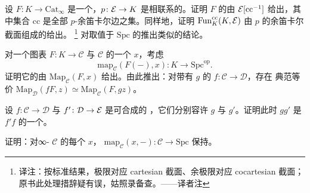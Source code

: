 \begin{exercise}\label{ex:colimit-cocartesian-localization}
设 $F\colon K \to \mathrm{Cat}_{\infty}$ 是一个\trFunctor{}，$p\colon \mathcal{E} \to K$
是相联系的\trCocartesianFibration{}。证明 $F$ 的\trColimit{}由 $\mathcal{E}[\mathrm{cc}^{-1}]$
给出，其中集合 $\mathrm{cc}$ 是全部 $p$-余笛卡尔边之集。同样地，证明\trLimit{}%
$\mathrm{Fun}^{\mathrm{cc}}_K(K, \mathcal{E})$ 由 $p$ 的余笛卡尔截面组成的\trCategory{}给出。%
\footnote{译注：按标准结果，极限对应 cartesian 截面、余极限对应 cocartesian 截面；
原书此处理措辞疑有误，姑照录备查。——译者注}
对取值于 $\mathrm{Spc}$ 的\trFunctor{}推出类似的结论。
\end{exercise}

\begin{exercise}\label{ex:limit-map-functor}
对一个图表 $F\colon K \to \mathcal{C}$ 与 $\mathcal{C}$ 的一个\trObject{} $x$，考虑%
\trFunctor{}%
\[
\mathrm{map}_{\mathcal{C}}(F(-), x)\colon K \to \mathrm{Spc}^{\mathrm{op}}.
\]
证明它的\trLimit{}由 $\mathrm{Map}_{\mathcal{C}}(F, x)$ 给出。由此推出：对带有%
\trRightAdjoint{} $g$ 的\trFunctor{} $f\colon \mathcal{C} \to \mathcal{D}$，存在
典范等价 $\mathrm{Map}_{\mathcal{D}}(fF, z) \simeq \mathrm{Map}_{\mathcal{C}}(F, gz)$。
\end{exercise}

\begin{exercise}\label{ex:right-adjoints-compose}
设 $f\colon \mathcal{C} \to \mathcal{D}$ 与 $f'\colon \mathcal{D} \to \mathcal{E}$ 是可合成的%
\trFunctor{}，它们分别容许\trRightAdjoint{} $g$ 与 $g'$。证明此时 $gg'$ 是
$f'f$ 的一个\trRightAdjoint{}。
\end{exercise}

\begin{exercise}\label{ex:map-preserves-limits}
证明：对∞-\trCategory{} $\mathcal{C}$ 的每个\trObject{} $x$，\trFunctor{}%
$\mathrm{map}_{\mathcal{C}}(x, -)\colon \mathcal{C} \to \mathrm{Spc}$ 保持\trLimit{}。
\end{exercise}
